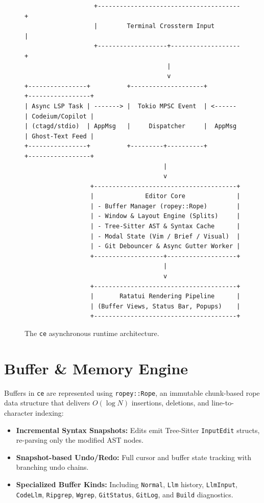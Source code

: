 \documentclass[11pt,a4paper,openany]{book}
\begin{document}
\begin{figure}[htbp]
\centering
\begin{tcolorbox}[colback=codebg,colframe=codeframe,arc=2mm,center,width=\textwidth]
\fontsize{8.5pt}{10pt}\selectfont
\begin{verbatim}
                   +---------------------------------------+
                   |        Terminal Crossterm Input       |
                   +-------------------+-------------------+
                                       |
                                       v
+----------------+          +--------------------+         +-----------------+
| Async LSP Task | -------> |  Tokio MPSC Event  | <------ | Codeium/Copilot |
| (ctagd/stdio)  | AppMsg   |     Dispatcher     |  AppMsg | Ghost-Text Feed |
+----------------+          +---------+----------+         +-----------------+
                                      |
                                      v
                  +---------------------------------------+
                  |              Editor Core              |
                  | - Buffer Manager (ropey::Rope)        |
                  | - Window & Layout Engine (Splits)     |
                  | - Tree-Sitter AST & Syntax Cache      |
                  | - Modal State (Vim / Brief / Visual)  |
                  | - Git Debouncer & Async Gutter Worker |
                  +-------------------+-------------------+
                                      |
                                      v
                  +---------------------------------------+
                  |       Ratatui Rendering Pipeline      |
                  | (Buffer Views, Status Bar, Popups)    |
                  +---------------------------------------+
\end{verbatim}
\end{tcolorbox}
\caption{The \texttt{ce} asynchronous runtime architecture.}
\end{figure}

\section{Buffer \& Memory Engine}
Buffers in \texttt{ce} are represented using \texttt{ropey::Rope}, an immutable chunk-based rope data structure that delivers $O(\log N)$ insertions, deletions, and line-to-character indexing:
\begin{itemize}[noitemsep]
    \item \textbf{Incremental Syntax Snapshots:} Edits emit Tree-Sitter \texttt{InputEdit} structs, re-parsing only the modified AST nodes.
    \item \textbf{Snapshot-based Undo/Redo:} Full cursor and buffer state tracking with branching undo chains.
    \item \textbf{Specialized Buffer Kinds:} Including \texttt{Normal}, \texttt{Llm} history, \texttt{LlmInput}, \texttt{CodeLlm}, \texttt{Ripgrep}, \texttt{Wgrep}, \texttt{GitStatus}, \texttt{GitLog}, and \texttt{Build} diagnostics.
\end{itemize}
\end{document}
